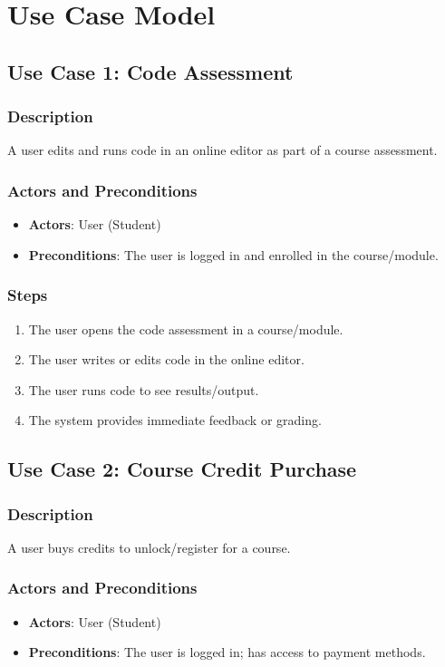 \documentclass[a4paper, 11pt]{scrreprt}
\begin{document}
\section{Use Case Model}
\subsection{Use Case 1: Code Assessment}
\subsubsection{Description}
A user edits and runs code in an online editor as part of a course assessment.

\subsubsection{Actors and Preconditions}
\begin{itemize}
    \item \textbf{Actors}: User (Student)
    \item \textbf{Preconditions}: The user is logged in and enrolled in the course/module.
\end{itemize}

\subsubsection{Steps}
\begin{enumerate}
    \item The user opens the code assessment in a course/module.
    \item The user writes or edits code in the online editor.
    \item The user runs code to see results/output.
    \item The system provides immediate feedback or grading.
\end{enumerate}

\subsection{Use Case 2: Course Credit Purchase}
\subsubsection{Description}
A user buys credits to unlock/register for a course.

\subsubsection{Actors and Preconditions}
\begin{itemize}
    \item \textbf{Actors}: User (Student)
    \item \textbf{Preconditions}: The user is logged in; has access to payment methods.
\end{itemize}
\end{document}

